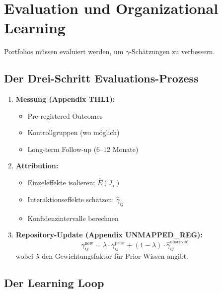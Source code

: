 \section{Evaluation und Organizational Learning}
\label{sec:20-learning}

Portfolios müssen evaluiert werden, um $\gamma$-Schätzungen zu verbessern.

\subsection{Der Drei-Schritt Evaluations-Prozess}

\begin{enumerate}
\item \textbf{Messung (Appendix THL1):}
   \begin{itemize}[nosep]
   \item Pre-registered Outcomes
   \item Kontrollgruppen (wo möglich)
   \item Long-term Follow-up (6--12 Monate)
   \end{itemize}

\item \textbf{Attribution:}
   \begin{itemize}[nosep]
   \item Einzeleffekte isolieren: $\hat{E}(\mathcal{I}_i)$
   \item Interaktionseffekte schätzen: $\hat{\gamma}_{ij}$
   \item Konfidenzintervalle berechnen
   \end{itemize}

\item \textbf{Repository-Update (Appendix UNMAPPED_REG):}
\begin{equation}
\gamma_{ij}^{\text{new}} = \lambda \cdot \gamma_{ij}^{\text{prior}} + (1-\lambda) \cdot \hat{\gamma}_{ij}^{\text{observed}}
\label{eq:20-bayesian-update}
\end{equation}
wobei $\lambda$ den Gewichtungsfaktor für Prior-Wissen angibt.
\end{enumerate}

\subsection{Der Learning Loop}

